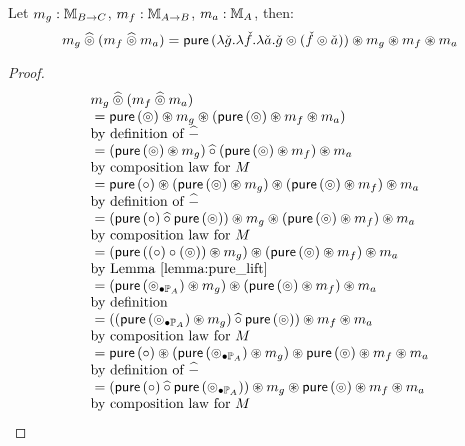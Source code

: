 \begin{lemmaa}{13}
Let $m_g:\mstream{B\rightarrow C}$, $m_f:\mstream{A\rightarrow B}$, $m_a:\mstream{A}$, then:
$$
m_g \alift{\pappl} (m_f \alift{\pappl} m_a)
 = \apure\, (\lambda \pstr{g}. \lambda \pstr{f}. \lambda \pstr{a}. \pstr{g} \pappl (\pstr{f}\pappl \pstr{a})) \appl m_g \appl m_f \appl m_a
$$
\end{lemmaa}
\begin{proof}
$$
\begin{array}{ll}
m_g \alift{\pappl} (m_f \alift{\pappl} m_a) \\
{}= \apure\, (\pappl) \appl m_g \appl (\apure\, (\pappl) \appl m_f \appl m_a) \\
 \mbox{by definition of }\alift{-}\\
{}= (\apure\, (\pappl) \appl m_g) \alift{\comp} (\apure\, (\pappl) \appl m_f)  \appl m_a \\
 \mbox{by composition law for }M \\
{}=   \apure\, (\comp) \appl  (\apure\, (\pappl) \appl m_g) \appl (\apure\, (\pappl) \appl m_f) \appl m_a \\
 \mbox{by definition of }\alift{-}\\
{}=   (\apure\, (\comp) \alift{\comp}  \apure\, (\pappl)) \appl m_g \appl (\apure\, (\pappl) \appl m_f) \appl m_a \\
 \mbox{by composition law for }M \\
{}=   ( \apure\, ((\comp) \comp (\pappl)) \appl m_g ) \appl (\apure\, (\pappl) \appl m_f)   \appl m_a\\
 \mbox{by Lemma \ref{lemma:pure_lift}}\\
{}=   ( \apure\, (\clift{\pappl}{\pstream{A}}) \appl m_g ) \appl (\apure\, (\pappl) \appl m_f)   \appl m_a\\
 \mbox{by definition}\\
{}=   ( ( \apure\, (\clift{\pappl}{\pstream{A}})  \appl m_g ) \alift{\comp} \apure\, (\pappl)) \appl m_f  \appl m_a\\
 \mbox{by composition law for }M \\
{}=  \apure\, (\comp) \appl (\apure\, (\clift{\pappl}{\pstream{A}})  \appl m_g ) \appl \apure\, (\pappl)  \appl m_f  \appl m_a\\
 \mbox{by definition of }\alift{-} \\
{}=   (\apure\, (\comp) \alift{\comp}  \apure\, (\clift{\pappl}{\pstream{A}}) ) \appl m_g \appl \apure\, (\pappl) \appl m_f \appl m_a\\
 \mbox{by composition law for }M \\

\end{array}$$
\end{proof}
